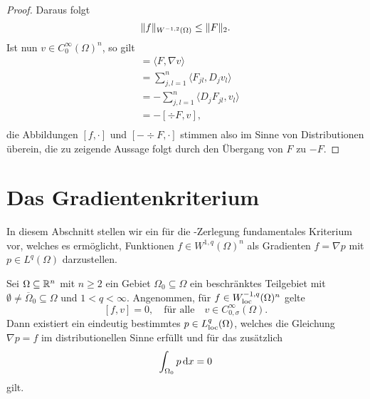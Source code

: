 \begin{proof}
  Daraus folgt
  $$
  \lVert f \rVert_{W^{-1,2}(\Omega)} \leq \lVert F \rVert_2.
  $$
  Ist nun $v \in C_0^\infty(\Omega)^n$, so gilt
  \begin{align*}
    [f,v]
    &= \langle F, \nabla v\rangle \\
    &= \sum_{j,l=1}^n \langle F_{jl}, D_j v_l \rangle \\
    &= -\sum_{j,l=1}^n \langle D_j F_{jl}, v_l \rangle \\
    &= -[\div F, v], \\
  \end{align*}
  die Abbildungen $[f,\cdot]$ und $[-\div F, \cdot]$ stimmen also im Sinne von Distributionen überein, die zu zeigende Aussage folgt durch den Übergang von $F$ zu $-F$.
\end{proof}

\section{Das Gradientenkriterium}

In diesem Abschnitt stellen wir ein für die \helmholtz\hyp{}Zerlegung fundamentales Kriterium vor, welches es ermöglicht, Funktionen $f \in W^{1,q}(\Omega)^n$ als Gradienten $f = \nabla p$ mit $p \in L^q(\Omega)$ darzustellen.

\begin{lem}
  Sei $\Omega \subseteq \mathbb{R}^n$ mit $n \geq 2$ ein Gebiet $\Omega_0 \subseteq \Omega$ ein beschränktes Teilgebiet mit $\emptyset \neq \overline\Omega_0 \subseteq \Omega$ und $1 < q < \infty$.
  Angenommen, für $f \in W_{\operatorname{loc}}^{-1,q}(\Omega)^n$ gelte
  \begin{equation}
    \label{eq:vKernel}
    [f,v] = 0, \quad \text{für alle} \quad v \in C_{0,\sigma}^\infty(\Omega).
  \end{equation}
  Dann existiert ein eindeutig bestimmtes $p \in L^q_{\operatorname{loc}}(\Omega)$, welches die Gleichung $\nabla p = f$ im distributionellen Sinne erfüllt und für das zusätzlich
  \begin{equation}
    \int_{\Omega_0} p \, {\operatorname{d}\!{x}} = 0
    \label{eq:0integral}
  \end{equation}
  gilt.
\end{lem}

